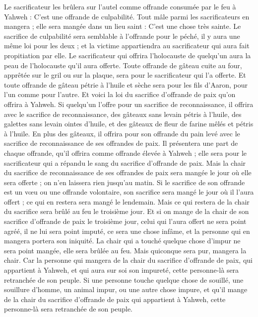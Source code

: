 \begin{multicols}{2}
Le sacrificateur les brûlera sur l’autel comme offrande consumée par le feu à Yahweh : C’est une offrande de culpabilité.
Tout mâle parmi les sacrificateurs en mangera ; elle sera mangée dans un lieu saint : C’est une chose très sainte.
Le sacrifice de culpabilité sera semblable à l'offrande pour le péché, il y aura une même loi pour les deux ; et la victime appartiendra au sacrificateur qui aura fait propitiation par elle.
Le sacrificateur qui offrira l’holocauste de quelqu’un aura la peau de l’holocauste qu’il aura offerte.
Toute offrande de gâteau cuite au four, apprêtée sur le gril ou sur la plaque, sera pour le sacrificateur qui l’a offerte.
Et toute offrande de gâteau pétrie à l’huile et sèche sera pour les fils d’Aaron, pour l’un comme pour l’autre.
Et voici la loi du sacrifice d’offrande de paix qu'on offrira à Yahweh.
Si quelqu'un l'offre pour un sacrifice de reconnaissance, il offrira avec le sacrifice de reconnaissance, des gâteaux sans levain pétris à l'huile, des galettes sans levain ointes d'huile, et des gâteaux de fleur de farine mêlés et pétris à l'huile.
En plus des gâteaux, il offrira pour son offrande du pain levé avec le sacrifice de reconnaissance de ses offrandes de paix.
Il présentera une part de chaque offrande, qu'il offrira comme offrande élevée à Yahweh ; elle sera pour le sacrificateur qui a répandu le sang du sacrifice d’offrande de paix.
Mais la chair du sacrifice de reconnaissance de ses offrandes de paix sera mangée le jour où elle sera offerte ; on n'en laissera rien jusqu'au matin.
Si le sacrifice de son offrande est un vœu ou une offrande volontaire, son sacrifice sera mangé le jour où il l’aura offert ; ce qui en restera sera mangé le lendemain.
Mais ce qui restera de la chair du sacrifice sera brûlé au feu le troisième jour.
Et si on mange de la chair de son sacrifice d’offrande de paix le troisième jour, celui qui l'aura offert ne sera point agréé, il ne lui sera point imputé, ce sera une chose infâme, et la personne qui en mangera portera son iniquité.
La chair qui a touché quelque chose d’impur ne sera point mangée, elle sera brûlée au feu. Mais quiconque sera pur, mangera la chair.
Car la personne qui mangera de la chair du sacrifice d’offrande de paix, qui appartient à Yahweh, et qui aura sur soi son impureté, cette personne-là sera retranchée de son peuple.
Si une personne touche quelque chose de souillé, une souillure d'homme, un animal impur, ou une autre chose impure, et qu'il mange de la chair du sacrifice d’offrande de paix qui appartient à Yahweh, cette personne-là sera retranchée de son peuple.

\end{multicols}
